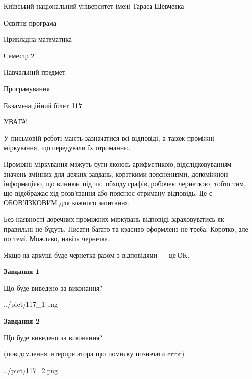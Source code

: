 \documentclass[12pt, ukrainian]{article}
\begin{document}
{{\begin {small}\par
{ \center  Київський національний університет імені Тараса Шевченка \par}
{\parbox {5 cm}{Освітня програма \hfill}{\parbox {7 cm}{Прикладна математика\hfill}}\parbox {6 cm}{\hfill Семестр 2}}\par
{\parbox {5 cm} {Навчальний предмет \hfill}\parbox {7 cm}{Програмування \hfill}\parbox {6cm}{\hfill}\par}\vspace{-7pt} \end{small}}{\center Екзаменаційний білет \No \textbf
{ 117 }\par}}
{
\begin {large}
УВАГА!

У письмовій роботі мають зазначатися всі відповіді, а також проміжні міркування, що передували їх отриманню.

Проміжні міркування можуть бути якоюсь арифметикою, відслідковуванням зна\-чень змінних для деяких завдань,
короткими поясненнями, допоміжною інформацією, що виникає під час обходу графів, робочею чернеткою,
тобто тим, що відображає хід розв’язання або пояснює отриману відповідь.
Це є ОБОВ’ЯЗКОВИМ для кожного запитання.

Без наявності доречних проміжних міркувань відповіді зараховуватись як правиль\-ні не будуть.
Писати багато та красиво оформлено не треба. Коротко, але по темі. Можли\-во, навіть чернетка.

Якщо на аркуші буде чернетка разом з відповідями --- це ОК.

\newpage

{\begin {center}\textbf{Завдання 1}\end {center}}\par
Що буде виведено за виконання?\par
\begin{center}
	{../pict/117_1.png}
\end{center}
\newpage

{\begin {center}\textbf{Завдання 2}\end {center}}\par
Що буде виведено за виконання?\par
 (повідомлення інтерпретатора про помилку позначати error)\par
\begin{center}
	{../pict/117_2.png}
\end{center}
\newpage


\end{large}}
\end{document}
